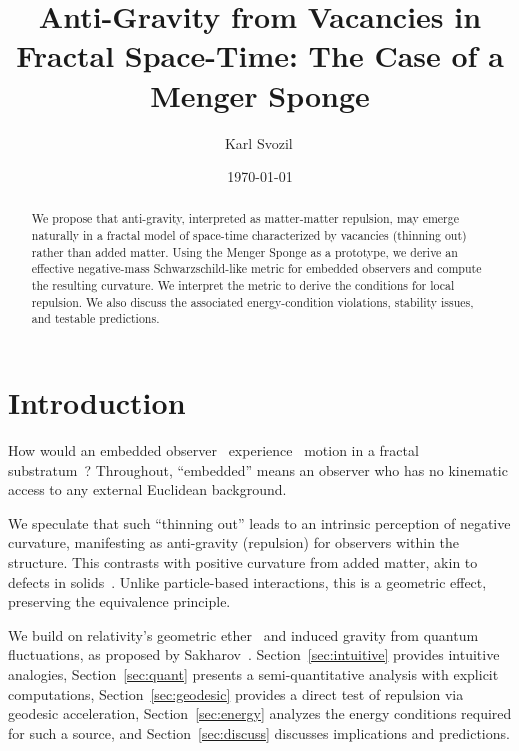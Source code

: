 \documentclass[%
  reprint,
  superscriptaddress,
  showpacs,
  showkeys,
  amsmath,amssymb,
  pra,
  longbibliography,
  floatfix,
]{revtex4-2}
\begin{document}
\title{Anti-Gravity from Vacancies in Fractal Space-Time: The Case of a Menger Sponge}

\author{Karl Svozil\,}

\date{\today}

\begin{abstract}
We propose that anti-gravity, interpreted as matter-matter repulsion, may emerge naturally in a fractal model of space-time characterized by vacancies (thinning out) rather than added matter. Using the Menger Sponge as a prototype, we derive an effective negative-mass Schwarzschild-like metric for embedded observers and compute the resulting curvature. We interpret the metric to derive the conditions for local repulsion. We also discuss the associated energy-condition violations, stability issues, and testable predictions.
\end{abstract}


\maketitle

\section{Introduction}
\label{sec:intro}

How would an embedded observer~\cite{toffoli:79,svozil-94} experience~\cite{sv1} motion in a fractal~\cite{falconer1} substratum~\cite{Ord-83}? Throughout, ``embedded'' means an observer who has no kinematic access to any external Euclidean background.

We speculate that such ``thinning out'' leads to an intrinsic perception of negative curvature, manifesting as anti-gravity (repulsion) for observers within the structure. This contrasts with positive curvature from added matter, akin to defects in solids~\cite{Kroner-1958,kroner-1990}. Unlike particle-based interactions, this is a geometric effect, preserving the equivalence principle.

We build on relativity's geometric ether~\cite{einstein-aether-en,dirac-aether} and induced gravity from quantum fluctuations, as proposed by Sakharov~\cite{Sakharov-67}. Section~\ref{sec:intuitive} provides intuitive analogies, Section~\ref{sec:quant} presents a semi-quantitative analysis with explicit computations, Section~\ref{sec:geodesic} provides a direct test of repulsion via geodesic acceleration, Section~\ref{sec:energy} analyzes the energy conditions required for such a source, and Section~\ref{sec:discuss} discusses implications and predictions.
\end{document}
